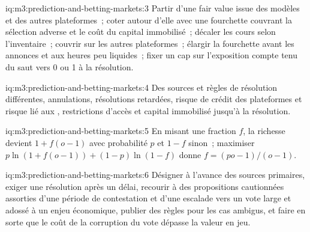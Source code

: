 \begin{solution}{iq:m3:prediction-and-betting-markets:3}
Partir d'une fair value issue des modèles et des autres plateformes~; coter autour d'elle avec une fourchette couvrant la sélection adverse et le coût du capital immobilisé~; décaler les cours selon
l'inventaire~; couvrir sur les autres plateformes~; élargir la fourchette avant les annonces et aux heures peu liquides~; fixer un cap sur l'exposition compte tenu du saut vers 0 ou 1 à la résolution.
\end{solution}

\begin{solution}{iq:m3:prediction-and-betting-markets:4}
Des sources et règles de résolution différentes, annulations, résolutions retardées, risque de crédit des plateformes et risque lié aux , restrictions d'accès et capital immobilisé jusqu'à
la résolution.
\end{solution}

\begin{solution}{iq:m3:prediction-and-betting-markets:5}
En misant une fraction $f$, la richesse devient $1 + f(o - 1)$ avec probabilité $p$ et $1 - f$ sinon~; maximiser $p\ln(1 + f(o - 1)) + (1 - p)\ln(1 - f)$ donne
$f = (po - 1)/(o - 1)$.
\end{solution}

\begin{solution}{iq:m3:prediction-and-betting-markets:6}
Désigner à l'avance des sources primaires, exiger une résolution après un délai, recourir à des propositions cautionnées assorties d'une période de contestation et d'une escalade vers un vote large et
adossé à un enjeu économique, publier des règles pour les cas ambigus, et faire en sorte que le coût de la corruption du vote dépasse la valeur en jeu.
\end{solution}
